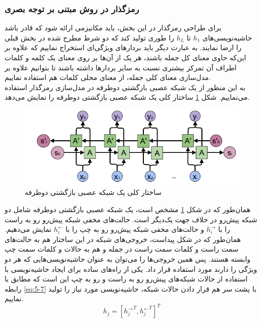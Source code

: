 \subsubsection{رمزگذار در روش مبتنی بر توجه بصری}
برای طراحی رمزگذار در این بخش، باید مکانیزمی ارائه شود که قادر باشد حاشیه‌نویسی‌های $h_1$ تا $h_L$ را طوری تولید کند که دو شرط مطرح شده در بخش قبلی را ارضا نمایند. به عبارت دیگر باید بردارهای ویژگی‌ای استخراج نماییم که علاوه بر این‌که حاوی معنای کل جمله باشند، هر یک از آن‌ها بر روی معنای یک کلمه و کلمات اطراف آن تمرکز بیشتری نسبت به سایر بردارها داشته باشند تا بتوانیم علاوه بر مدل‌سازی معنای کلی جمله، از معنای محلی کلمات هم استفاده نماییم.
\\
به این منظور از یک شبکه عصبی بازگشتی دوطرفه در مدل‌سازی رمزگذار استفاده می‌نماییم. شکل \ref{fig:biencoder} ساختار کلی یک شبکه عصبی بازگشتی دوطرفه را نمایش می‌دهد. 

\begin{figure}[h]
	\centering
	\includegraphics[scale=0.6]{Imgs/biencoder.png}
	\caption{ساختار کلی یک شبکه عصبی بازگشتی دوطرفه}
	\label{fig:biencoder}
\end{figure}

همان‌طور که در شکل \ref{fig:biencoder} مشخص است، یک شبکه عصبی بازگشتی دوطرفه شامل دو شبکه پیش‌رو در خلاف جهت یک‌دیگر است. حالت‌های مخفی شبکه پیش‌رو رو به راست را با $h_i^\rightarrow$ و حالت‌های مخفی شبکه پیش‌رو رو به چپ را با $h_i^\leftarrow$ نمایش می‌دهیم. همان‌طور که در شکل پیداست، خروجی‌های شبکه در این ساختار هم به حالت‌های سمت راست و کلمات سمت راست در جمله و هم به حالات و کلمات سمت چپ وابسته هستند. پس همین خروجی‌ها را می‌توان به عنوان حاشیه‌نویسی‌هایی که هر دو ویژگی را دارند مورد استفاده قرار داد.
یکی از راه‌های ساده برای ایجاد حاشیه‌نویسی با استفاده از حالات شبکه‌های پیش‌رو رو به راست و رو به چپ این است که مطابق با رابطه \eqref{eq:5-7} با پشت سر هم قرار دادن حالات شبکه، حاشیه‌نویسی مورد نیاز را تولید نماییم.
\begin{equation}
h_j = [{h_j^\rightarrow}^T, {h_j^\leftarrow}^T]^T
\label{eq:5-7}
\end{equation}



